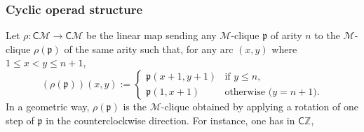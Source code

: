 \documentclass[10pt,reqno]{amsart}
\numberwithin{equation}{subsection}
\renewcommand{\leq}{\leqslant}
\newcommand{\Z}{\mathbb{Z}}
\newcommand{\Mca}{\mathcal{M}}
\newcommand{\Pfr}{\mathfrak{p}}
\newcommand{\Cli}{\mathsf{C}}
\begin{document}
\subsubsection{Cyclic operad structure}
Let $\rho : \Cli\Mca \to \Cli\Mca$ be the linear map sending any
$\Mca$-clique $\Pfr$ of arity $n$ to the $\Mca$-clique $\rho(\Pfr)$ of
the same arity such that, for any arc $(x, y)$ where
$1 \leq x < y \leq n + 1$,
\begin{equation} \label{equ:rotation_map_Cli_M}
    (\rho(\Pfr))(x, y) :=
    \begin{cases}
        \Pfr(x + 1, y + 1) & \mbox{if } y \leq n, \\
        \Pfr(1, x + 1) & \mbox{otherwise (} y = n + 1 \mbox{)}.
    \end{cases}
\end{equation}
In a geometric way, $\rho(\Pfr)$ is the $\Mca$-clique obtained by
applying a rotation of one step of $\Pfr$ in the counterclockwise
direction. For instance, one has in $\Cli\Z$,
\end{document}

